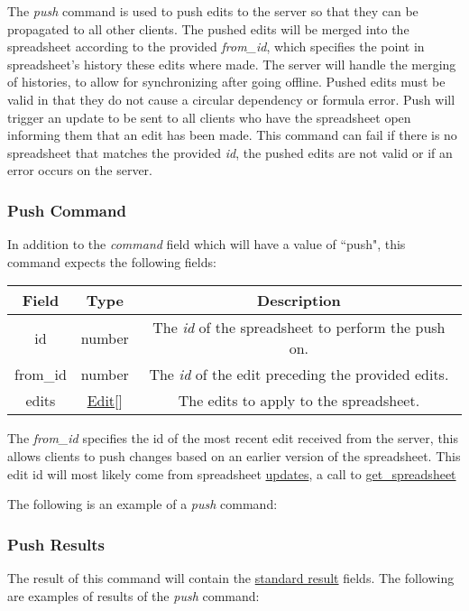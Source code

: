 The \emph{push} command is used to push edits to the server so that they can 
be propagated to all other clients. The pushed edits will be merged into the 
spreadsheet according to the provided \emph{from\_id}, which specifies the 
point in spreadsheet’s history these edits where made. The server will handle 
the merging of histories, to allow for synchronizing after going offline. 
Pushed edits must be valid in that they do not cause a circular dependency or 
formula error. Push will trigger an update to be sent to all clients who have 
the spreadsheet open informing them that an edit has been made. This command 
can fail if there is no spreadsheet that matches the provided \emph{id}, the 
pushed edits are not valid or if an error occurs on the server.

\subsubsection{Push Command}
In addition to the \emph{command} field which will have a value of ``push", this command expects the following fields:
\begin{table}[H]
    \begin{center}
        \begin{tabular}{|c|c|c|}\hline
            Field & Type & Description \\\hline
            id & number & The \emph{id} of the spreadsheet to perform the push on. \\\hline
            from\_id & number & The \emph{id} of the edit preceding the provided edits. \\\hline
            edits & \hyperref[sec:message:edits]{Edit}[] & The edits to apply to the spreadsheet. \\\hline
        \end{tabular}
    \end{center}
\end{table}
The \emph{from\_id} specifies the id of the most recent edit received from the server, this allows clients to push changes
based on an earlier version of the spreadsheet. This edit id will most likely come from spreadsheet \hyperref[lst:update:edits]{updates},
a call to \hyperref[sec:message:get_spreadsheet]{get\_spreadsheet}

The following is an example of a \emph{push} command:


\subsubsection{Push Results}
The result of this command will contain the \hyperref[sec:message:result]{standard result} fields.
The following are examples of results of the \emph{push} command:



